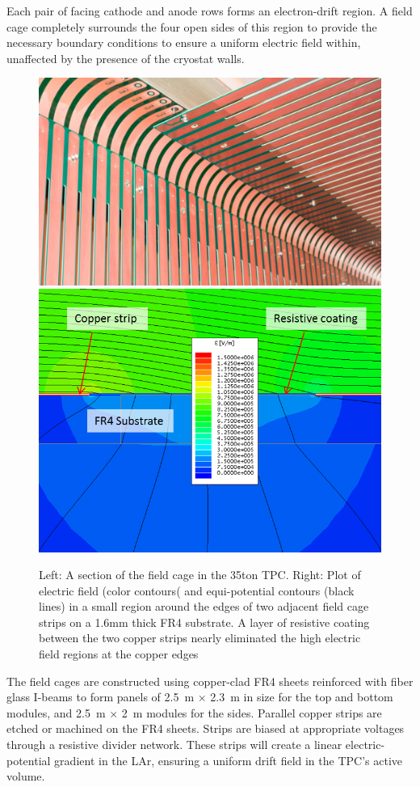


Each pair of facing cathode and anode rows forms an electron-drift region.  A field cage  completely surrounds the four open sides of this region to provide the necessary boundary conditions to ensure a uniform electric field within, unaffected by the presence of the cryostat walls.

\begin{figure}[htb]
\centering
\includegraphics[width=.49\textwidth]{figures/TPC_FCA_1}
\includegraphics[width=.49\textwidth]{figures/TPC_FCA_2}
\caption{Left: A section of the field cage in the 35ton TPC. Right: Plot of electric field (color contours( and equi-potential contours (black lines) in a small region around the edges of two adjacent field cage strips on a 1.6mm thick FR4 substrate.  A layer of resistive coating between the two copper strips nearly eliminated the high electric field regions at the copper edges }
\label{fig:tpc_fca_1}
\end{figure}    

   

The field cages are constructed using copper-clad FR4 sheets reinforced with fiber glass I-beams to form panels of 2.5~m $\times$ 2.3~m in size for the top and bottom modules, and 2.5~m $\times$ 2~m modules for the sides.  Parallel copper strips are etched or machined on the FR4 sheets.  Strips are biased at appropriate voltages through a resistive divider network. These strips will create a linear electric-potential gradient in the LAr, ensuring a uniform drift field in the TPC's active volume. 
 
